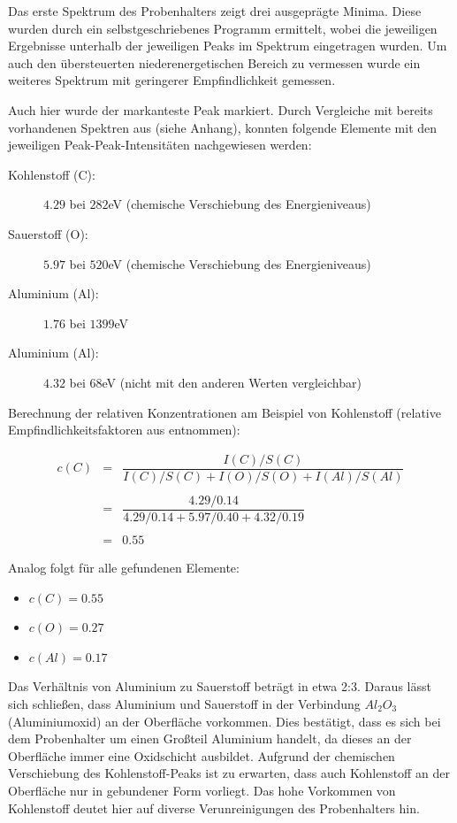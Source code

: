 		Das erste Spektrum des Probenhalters zeigt drei ausgeprägte Minima.
		Diese wurden durch ein selbstgeschriebenes Programm ermittelt, wobei die jeweiligen Ergebnisse unterhalb der jeweiligen Peaks im Spektrum eingetragen wurden.
		Um auch den übersteuerten niederenergetischen Bereich zu vermessen wurde ein weiteres Spektrum mit geringerer Empfindlichkeit gemessen.

		Auch hier wurde der markanteste Peak markiert.
		Durch Vergleiche mit bereits vorhandenen Spektren aus \cite{handbook} (siehe Anhang), konnten folgende Elemente mit den jeweiligen Peak-Peak-Intensitäten nachgewiesen werden:

		\begin{description}
			\item[Kohlenstoff (C):] $4.29$ bei $282$eV (chemische Verschiebung des Energieniveaus)
			\item[Sauerstoff (O):] $5.97$ bei $520$eV (chemische Verschiebung des Energieniveaus)
			\item[Aluminium (Al):] $1.76$ bei $1399$eV
			\item[Aluminium (Al):] $4.32$ bei $68$eV (nicht mit den anderen Werten vergleichbar)
		\end{description}

		Berechnung der relativen Konzentrationen am Beispiel von Kohlenstoff (relative Empfindlichkeitsfaktoren aus \cite{article} entnommen):

		\begin{eqnarray*}
			c(C) &=& \dfrac{I(C)/S(C)}{I(C)/S(C) + I(O)/S(O) + I(Al)/S(Al)} \\
				&& \\
				&=& \dfrac{4.29/0.14}{4.29/0.14 + 5.97/0.40 + 4.32/0.19} \\
				&& \\
				&=& 0.55
		\end{eqnarray*}

		Analog folgt für alle gefundenen Elemente:
		\begin{itemize}
			\item 
				$c(C) = 0.55$
			\item
				$c(O) = 0.27$
			\item
				$c(Al) = 0.17$
		\end{itemize}

		Das Verhältnis von Aluminium zu Sauerstoff beträgt in etwa 2:3.
		Daraus lässt sich schließen, dass Aluminium und Sauerstoff in der Verbindung $Al_2O_3$ (Aluminiumoxid) an der Oberfläche vorkommen.
		Dies bestätigt, dass es sich bei dem Probenhalter um einen Großteil Aluminium handelt, da dieses an der Oberfläche immer eine Oxidschicht ausbildet.
		Aufgrund der chemischen Verschiebung des Kohlenstoff-Peaks ist zu erwarten, dass auch Kohlenstoff an der Oberfläche nur in gebundener Form vorliegt.
		Das hohe Vorkommen von Kohlenstoff deutet hier auf diverse Verunreinigungen des Probenhalters hin.

